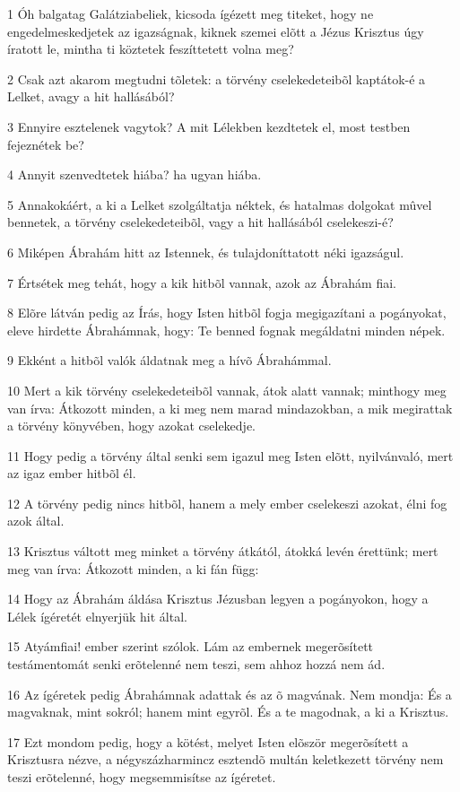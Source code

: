 \par 1 Óh balgatag Galátziabeliek, kicsoda ígézett meg titeket, hogy ne engedelmeskedjetek az igazságnak, kiknek szemei elõtt a Jézus Krisztus úgy íratott le, mintha ti köztetek feszíttetett volna meg?
\par 2 Csak azt akarom megtudni tõletek: a törvény cselekedeteibõl kaptátok-é a Lelket, avagy a hit hallásából?
\par 3 Ennyire esztelenek vagytok? A mit Lélekben kezdtetek el, most testben fejeznétek be?
\par 4 Annyit szenvedtetek hiába? ha ugyan hiába.
\par 5 Annakokáért, a ki a Lelket szolgáltatja néktek, és hatalmas dolgokat mûvel bennetek, a törvény cselekedeteibõl, vagy a hit hallásából cselekeszi-é?
\par 6 Miképen Ábrahám hitt az Istennek, és tulajdoníttatott néki igazságul.
\par 7 Értsétek meg tehát, hogy a kik hitbõl vannak, azok az Ábrahám fiai.
\par 8 Elõre látván pedig az Írás, hogy Isten hitbõl fogja megigazítani a pogányokat, eleve hirdette Ábrahámnak, hogy: Te benned fognak megáldatni minden népek.
\par 9 Ekként a hitbõl valók áldatnak meg a hívõ Ábrahámmal.
\par 10 Mert a kik törvény cselekedeteibõl vannak, átok alatt vannak; minthogy meg van írva: Átkozott minden, a ki meg nem marad mindazokban, a mik megirattak a törvény könyvében, hogy azokat cselekedje.
\par 11 Hogy pedig a törvény által senki sem igazul meg Isten elõtt, nyilvánvaló, mert az igaz ember hitbõl él.
\par 12 A törvény pedig nincs hitbõl, hanem a mely ember cselekeszi azokat, élni fog azok által.
\par 13 Krisztus váltott meg minket a törvény átkától, átokká levén érettünk; mert meg van írva: Átkozott minden, a ki fán  függ:
\par 14 Hogy az Ábrahám áldása Krisztus Jézusban legyen a pogányokon, hogy a Lélek ígéretét elnyerjük hit által.
\par 15 Atyámfiai! ember szerint szólok. Lám az embernek megerõsített testámentomát senki erõtelenné nem teszi, sem ahhoz hozzá nem ád.
\par 16 Az ígéretek pedig Ábrahámnak adattak és az õ magvának. Nem mondja: És a magvaknak, mint sokról; hanem mint egyrõl. És a te magodnak, a ki a Krisztus.
\par 17 Ezt mondom pedig, hogy a kötést, melyet Isten elõször megerõsített a Krisztusra nézve, a négyszázharmincz esztendõ multán keletkezett törvény nem teszi erõtelenné, hogy megsemmisítse az ígéretet.
